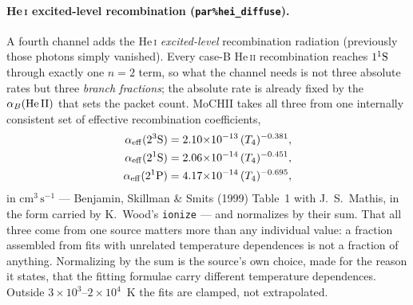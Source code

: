 \documentclass[english,a4paper]{my_memo}
\newcommand{\code}[1]{\texttt{#1}}
\newcommand{\cmc}{\mathrm{cm^{3}\,s^{-1}}}
\begin{document}
\paragraph{He\,\textsc{i} excited-level recombination
(\code{par\%hei\_diffuse}).}
A fourth channel adds the He\,\textsc{i} \emph{excited-level} recombination
radiation (previously those photons simply vanished).  Every case-B
He\,\textsc{ii} recombination reaches $1^1{\rm S}$ through exactly one
$n = 2$ term, so what the channel needs is not three absolute rates but
three \emph{branch fractions}; the absolute rate is already fixed by the
$\alpha_B({\rm He\,II})$ that sets the packet count.  MoCHII takes all three
from one internally consistent set of effective recombination coefficients,
\begin{equation}
\begin{aligned}
 \alpha_{\rm eff}(2^3{\rm S}) &= 2.10{\times}10^{-13}\,(T_4)^{-0.381}, \\
 \alpha_{\rm eff}(2^1{\rm S}) &= 2.06{\times}10^{-14}\,(T_4)^{-0.451}, \\
 \alpha_{\rm eff}(2^1{\rm P}) &= 4.17{\times}10^{-14}\,(T_4)^{-0.695},
\end{aligned}
 \label{eq:hei-branch}
\end{equation}
in $\cmc$ --- Benjamin, Skillman \& Smits (1999) Table~1 with J.~S.\ Mathis,
in the form carried by K.~Wood's \code{ionize} --- and normalizes by their
sum.  That all three come from one source matters more than any individual
value: a fraction assembled from fits with unrelated temperature dependences
is not a fraction of anything.  Normalizing by the sum is the source's own
choice, made for the reason it states, that the fitting formulae carry
different temperature dependences.  Outside $3{\times}10^3$--$2{\times}10^4$~K
the fits are clamped, not extrapolated.
\end{document}
